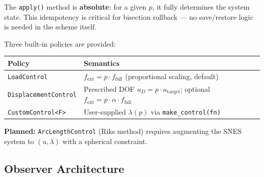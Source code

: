 \noindent
The \texttt{apply()} method is \textbf{absolute}: for a given $p$, it fully
determines the system state.  This idempotency is critical for bisection
rollback --- no save/restore logic is needed in the scheme itself.

Three built-in policies are provided:

\begin{center}
\begin{tabular}{@{}lp{8cm}@{}}
\toprule
\textbf{Policy} & \textbf{Semantics} \\
\midrule
\texttt{LoadControl}         & $f_{\text{ext}} = p \cdot f_{\text{full}}$ (proportional scaling, default) \\
\texttt{DisplacementControl} & Prescribed DOF $u_D = p \cdot u_{\text{target}}$; optional $f_{\text{ext}} = p \cdot \alpha \cdot f_{\text{full}}$ \\
\texttt{CustomControl<F>}    & User-supplied $\lambda(p)$ via \texttt{make\_control(fn)} \\
\bottomrule
\end{tabular}
\end{center}

\noindent
\textbf{Planned:} \texttt{ArcLengthControl} (Riks method) requires augmenting
the SNES system to $(u, \lambda)$ with a spherical constraint.


\subsection{Observer Architecture}
\label{sec:arch:analysis:observers}

\begin{center}
\end{center}

